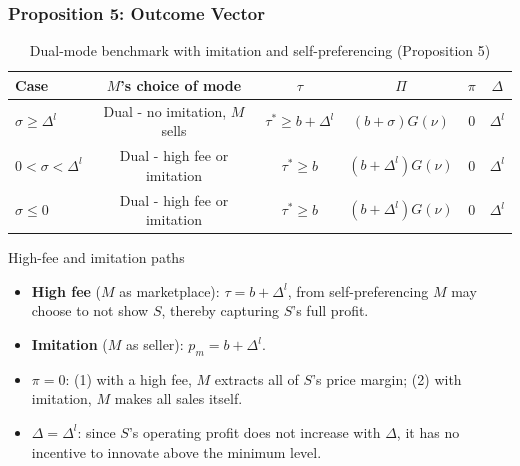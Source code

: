 \begin{frame}
  \frametitle{Proposition 5: Outcome Vector}
  \scriptsize
 
  \begin{table}
    \centering
    \caption{Dual-mode benchmark with imitation and self-preferencing (Proposition 5)}
    \label{tab:Proposition5}
    \begin{tabular}{@{}lccccc@{}}
      \toprule
      Case & $M$'s choice of mode & $\tau$ & $\Pi$ & $\pi$ & $\Delta$  \\
      \midrule
      $\sigma\geq\Delta^l$
        & Dual - no imitation, $M$ sells
        & $\tau^* \geq b + \Delta^l$  
        & $(b+\sigma)G(\nu)$
        & $0$
        & $\Delta^l$ \\
      $0<\sigma<\Delta^l$
        & Dual - high fee or imitation
        & $\tau^* \geq b$
        & $(b+\Delta^l)G(\nu)$
        & $0$
        & $\Delta^l$ \\
      $\sigma\leq0$
        & Dual - high fee or imitation
        & $\tau^* \geq b$
        & $(b+\Delta^l)G(\nu)$
        & $0$
        & $\Delta^l$ \\
      \bottomrule
    \end{tabular}
  \end{table}

  \begin{block}{High-fee and imitation paths}
    \begin{itemize}
      \item \textbf{High fee} ($M$ as marketplace): $\tau = b + \Delta^l$, from self-preferencing $M$ may choose to not show $S$, thereby capturing $S$'s full profit.
      \item \textbf{Imitation} ($M$ as seller): $p_m = b + \Delta^l$.
    \end{itemize}
  \end{block}

  \begin{itemize}
    \item $\pi=0$: (1) with a high fee, $M$ extracts all of $S$'s price margin;
      (2) with imitation, $M$ makes all sales itself.
    \item $\Delta=\Delta^l$: since $S$'s operating profit does not increase
      with $\Delta$, it has no incentive to innovate above the minimum level.
  \end{itemize}

\end{frame}

